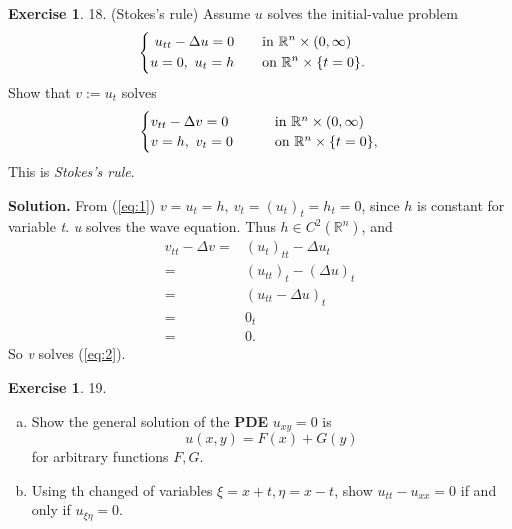 \message{ !name(PDE-hw5-21935004-\unexpanded{谭焱}.tex)}\documentclass[a4paper]{book}
\newenvironment{solution}%
{\noindent\textbf{Solution.}}%
{\qedhere}
\numberwithin{equation}{chapter}
\theoremstyle{definition}
\newtheorem{exc}[exm]{Exercise}
\begin{document}
\begin{multicols}{2}
  \setlength{\columnseprule}{0.2pt}

  \begin{exc}
    18.  (Stokes's rule) Assume $ u $ solves the initial-value problem
    \begin{equation}\label{eq:1}
    \begin{cases}
      \begin{aligned}
        u_{tt} - \Delta u = 0 \qquad &\textmd{in} \ \mathbb{R}^n \times (0, \infty) \\
        u = 0, \ u_t = h \qquad     &\textmd{on} \ \mathbb{R}^n \times \{t = 0\}.
      \end{aligned}
    \end{cases}
  \end{equation}
  Show that $v := u_t $ solves
  \begin{align}\label{eq:2}
    \begin{cases}
      v_{tt} - \Delta v = 0  \qquad & \textmd{in} \ \mathbb{R}^n \times (0, \infty)  \\
      v = h, \ v_t = 0 \qquad      & \textmd{on} \ \mathbb{R}^n \times \{t = 0\},
    \end{cases}
  \end{align}
  This is \textit{Stokes's rule}.
\end{exc}

\begin{solution}
  From (\ref{eq:1}) $v = u_t = h, \ v_t = {(u_t)}_t = h_t = 0$, since $h$ is constant for variable \textit{t}. \textit{u} solves the wave equation. Thus $h \in C^2(\mathbb{R}^n)$, and
  \begin{align*}
    v_{tt} - \Delta v =& {(u_t)}_{tt} - \Delta u_t \\
    =& {(u_{tt})}_t - {(\Delta u)}_t \\
    =& {(u_{tt} - \Delta u)}_t \\
    =& 0_t \\
    =& 0.
  \end{align*}
  So \textit{v} solves (\ref{eq:2}).
\end{solution}



\begin{exc}
  19.  
  \begin{enumerate} [(a)]
  \item Show the general solution of the \textbf{PDE} $u_{xy} = 0$ is
    \begin{equation*}
      u(x,y) = F(x) + G(y)
    \end{equation*}
    for arbitrary functions $F,G$.
  \item Using th changed of variables $\xi = x + t, \eta = x - t$, show $u_{tt} - u_{xx} = 0$ if and only if $u_{\xi \eta} = 0$.


\end{enumerate}
\end{exc}
\end{multicols}
\end{document}
